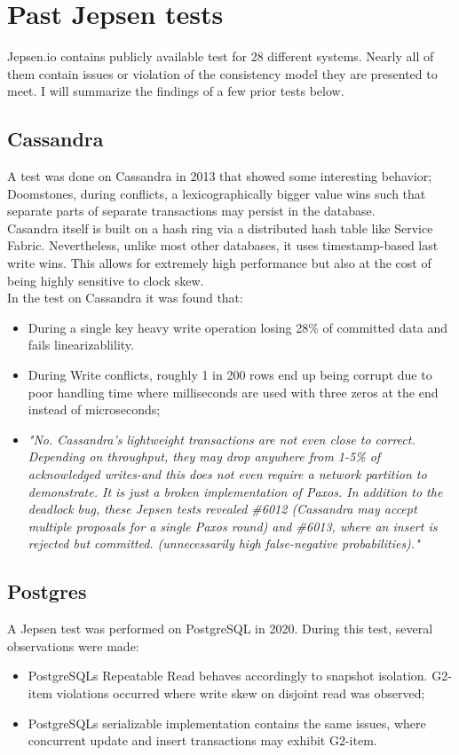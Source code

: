 \documentclass[a4paper,10pt,titlepage]{report}
\begin{document}
\section{Past Jepsen tests}
Jepsen.io contains publicly available test for 28 different systems. Nearly all of them contain issues or violation of the consistency model they are presented to meet. I will summarize the findings of a few prior tests below.
\subsection{Cassandra}
A test was done on Cassandra\cite{jepsencassandra} in 2013 that showed some interesting behavior; Doomstones, during conflicts, a lexicographically bigger value wins such that separate parts of separate transactions may persist in the database.\\
\vspace{5mm}
Casandra itself is built on a hash ring via a distributed hash table like Service Fabric. Nevertheless, unlike most other databases, it uses timestamp-based last write wins. This allows for extremely high performance but also at the cost of being highly sensitive to clock skew.\\

In the test on Cassandra it was found that:
\begin{itemize}
    \item During a single key heavy write operation losing 28\% of committed data and fails linearizablility.
    \item During Write conflicts, roughly 1 in 200 rows end up being corrupt due to poor handling time where milliseconds are used with three zeros at the end instead of microseconds;
    \item \textit{"No. Cassandra's lightweight transactions are not even close to correct. Depending on throughput, they may drop anywhere from 1-5\% of acknowledged writes-and this does not even require a network partition to demonstrate. It is just a broken implementation of Paxos. In addition to the deadlock bug, these Jepsen tests revealed \#6012 (Cassandra may accept multiple proposals for a single Paxos round) and \#6013, where an insert is rejected but committed. (unnecessarily high false-negative probabilities)."}\cite{jepsencassandra}
\end{itemize}

\subsection{Postgres}
A Jepsen test\cite{jepsenpostgresql} was performed on PostgreSQL in 2020. During this test, several observations were made:
\begin{itemize}
    \item PostgreSQLs Repeatable Read behaves accordingly to snapshot isolation. G2-item violations occurred where write skew on disjoint read was observed;
    \item PostgreSQLs serializable implementation contains the same issues, where concurrent update and insert transactions may exhibit G2-item.
\end{itemize}
\end{document}
